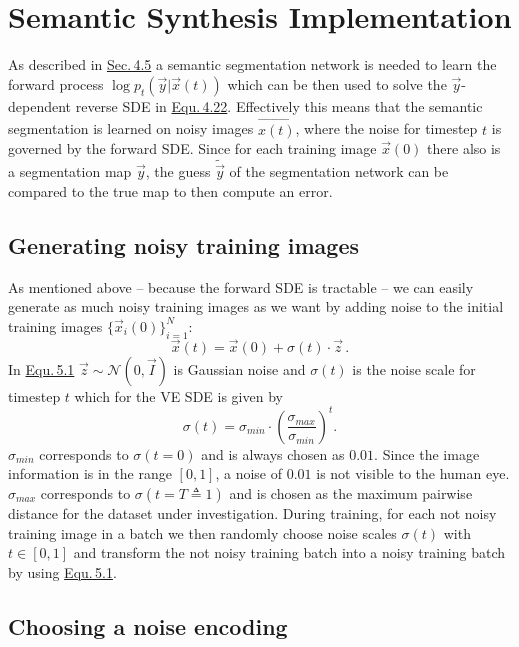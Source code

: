 \section{Semantic Synthesis Implementation} 
As described in \hyperref[sec:4.5]{Sec.\,4.5} a semantic segmentation network is needed to learn the forward process $\log p_t(\vec{y}|\vec{x}(t))$ which can be then used to solve the $\vec{y}$-dependent reverse SDE in \hyperref[equ:4.22]{Equ.\,4.22}. Effectively this means that the semantic segmentation is learned on noisy images $\vec{x(t)}$, where the noise for timestep $t$ is governed by the forward SDE. Since for each training image $\vec{x}(0)$ there also is a segmentation map $\vec{y}$, the guess $\tilde{\vec{y}}$ of the segmentation network can be compared to the true map to then compute an error. 

\subsection{Generating noisy training images}

As mentioned above – because the forward SDE is tractable – we can easily generate as much noisy training images as we want by adding noise to the initial training images $\{\vec{x}_i(0)\}_{i=1}^N$:
%
\begin{equation} \label{equ:5.1}
    \vec{x}(t)=\vec{x}(0)+\sigma(t)\cdot\vec{z}\,.
\end{equation}
%
In \hyperref[equ:5.1]{Equ.\,5.1} $\vec{z}\sim\mathcal{N}(0, \vec{I})$ is Gaussian noise and $\sigma(t)$ is the noise scale for timestep $t$ which for the VE SDE is given by
%
\begin{equation} \label{5.2}
    \sigma(t)=\sigma_{min}\cdot\left(\frac{\sigma_{max}}{\sigma_{min}}\right)^t.
\end{equation}
%
$\sigma_{min}$ corresponds to $\sigma(t=0)$ and is always chosen as $0.01$. Since the image information is in the range $[0,1]$, a noise of $0.01$ is not visible to the human eye. $\sigma_{max}$ corresponds to $\sigma(t=T\triangleq1)$ and is chosen as the maximum pairwise distance for the dataset under investigation. During training, for each not noisy training image in a batch we then randomly choose noise scales $\sigma(t)$ with $t\in[0,1]$ and transform the not noisy training batch into a noisy training batch by using \hyperref[equ:5.1]{Equ.\,5.1}.

\subsection{Choosing a noise encoding}


